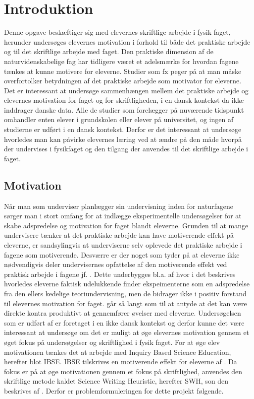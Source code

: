 \chapter{Introduktion}
\label{Ch:1}

Denne opgave beskæftiger sig med elevernes skriftlige arbejde i fysik faget, herunder undersøges elevernes motivation i forhold til både det praktiske arbejde og til det skriftlige arbejde med faget. Den praktiske dimension af de naturvidenskabelige fag har tidligere været et adelsmærke for hvordan fagene tænkes at kunne motivere for eleverne. Studier som fx \citep{Hodson2008} peger på at man måske overfortolker betydningen af det praktiske arbejde som motivator for eleverne. Det er interessant at undersøge sammenhængen mellem det praktiske arbejde og elevernes motivation for faget og for skriftligheden, i en dansk kontekst da \citep{Hodson2008} ikke inddrager danske data. Alle de studier som forelægger på nuværende tidspunkt omhandler enten elever i grundskolen eller elever på universitet, og ingen af studierne er udført i en dansk kontekst. Derfor er det interessant at undersøge hvorledes man kan påvirke elevernes læring ved at ændre på den måde hvorpå der undervises i fysikfaget og den tilgang der anvendes til det skriftlige arbejde i faget. 

\section{Motivation}
\label{sec:1.1}
Når man som underviser planlægger sin undervisning inden for naturfagene sørger man i stort omfang for at indlægge eksperimentelle undersøgelser for at skabe adspredelse og motivation for faget blandt eleverne. Grunden til at mange undervisere tænker at det praktiske arbejde kan have motiverende effekt på eleverne, er sandsylingvis at underviserne selv oplevede det praktiske arbejde i fagene som motiverende. Desværre er der noget som tyder på at eleverne ikke nødvendigvis deler undervisernes opfattelse af den motiverende effekt ved praktisk arbejde i fagene jf. \citep[s. 65 - 69]{Krogh2016}. 
Dette underbygges bl.a. af \citep{Hodson2008} hvor i det beskrives hvorledes eleverne faktisk udelukkende finder ekspeimenterne som en adspredelse fra den ellers kedelige teoriundervisning, men de bidrager ikke i positiv forstand til elevernes motivation for faget.  \citet[]{Hodson2008} går så langt som til at antyde at det kan være direkte kontra produktivt at gennemfører øvelser med eleverne. 
Undersøgelsen som er udført af \citet{Hodson2008} er foretaget i en ikke dansk kontekst og derfor kunne det være interessant at undersøge om det er muligt at øge elevernes motivation gennem et øget fokus på undersøgelser og skriftlighed i fysik faget. For at øge elev motivationen tænkes det at arbejde med Inquiry Based Science Education, herefter blot IBSE\def\ib{IBSE}. \ib{} tilskrives en motiverende effekt for eleverne af \citep{Krogh2016, Dolin2014}. Da fokus er på at øge motivationen gennem et fokus på skriftlighed, anvendes den skriftlige metode kaldet Science Writing Heuristic, herefter SWH\def\sw{SWH}, son den beskrives af \citep{Keys1999, Krogh2016}. Derfor er problemformuleringen for dette projekt følgende.


